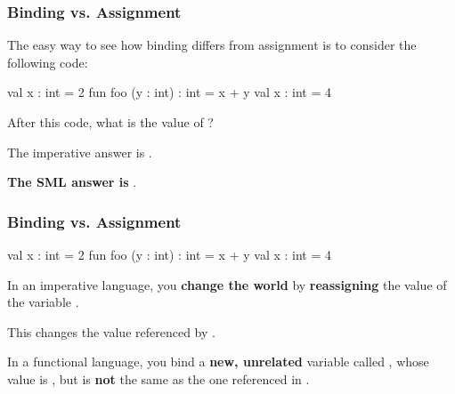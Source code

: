 \documentclass[aspectratio=169]{beamer}
\begin{document}
\begin{frame}[fragile]
  \frametitle{Binding vs. Assignment}

  The easy way to see how binding differs from assignment is to consider
  the following code:

  \pause
  \vspace{\fill}

  \begin{codeblock}
    val x : int = 2
    fun foo (y : int) : int = x + y
    val x : int = 4
  \end{codeblock}

  \pause
  \vspace{\fill}

  After this code, what is the value of ?

  \pause
  \vspace{\fill}

  The imperative answer is .

  \pause
  \vspace{\fill}

  \textbf{The SML answer is }.
\end{frame}

\begin{frame}[fragile]
  \frametitle{Binding vs. Assignment}

  \begin{codeblock}
    val x : int = 2
    fun foo (y : int) : int = x + y
    val x : int = 4
  \end{codeblock}

  \pause
  \vspace{\fill}

  In an imperative language, you \textbf{change the world} by \textbf{reassigning} the
  value of the variable .

  \vspace{5pt}

  This changes the value referenced by .

  \pause
  \vspace{\fill}

  In a functional language, you bind a \textbf{new, unrelated} variable called ,
  whose value is , but is \textbf{not} the same as the one referenced in .

  \vspace{\fill}

\end{frame}
\end{document}
